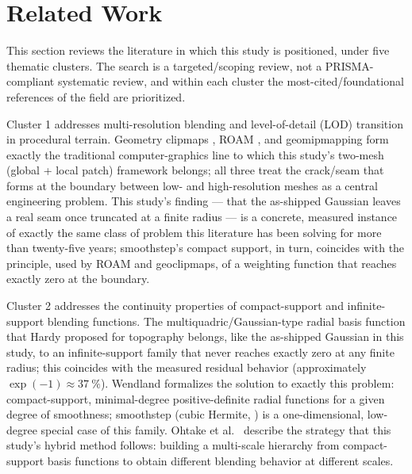 \section{Related Work}
\label{sec:ilgili}

This section reviews the literature in which this study is positioned,
under five thematic clusters. The search is a targeted/scoping review,
not a PRISMA-compliant systematic review, and within each cluster the
most-cited/foundational references of the field are prioritized.

Cluster 1 addresses multi-resolution blending and level-of-detail (LOD)
transition in procedural terrain. Geometry clipmaps
\citep{losasso2004geometry}, ROAM \citep{duchaineau1997roaming}, and
geomipmapping \citep{deboer2000geomipmapping} form exactly the
traditional computer-graphics line to which this study's two-mesh
(global + local patch) framework belongs; all three treat the
crack/seam that forms at the boundary between low- and high-resolution
meshes as a central engineering problem. This study's finding --- that
the as-shipped Gaussian leaves a real seam once truncated at a finite
radius --- is a concrete, measured instance of exactly the same class of
problem this literature has been solving for more than twenty-five
years; smoothstep's compact support, in turn, coincides with the
principle, used by ROAM and geoclipmaps, of a weighting function that
reaches exactly zero at the boundary.

Cluster 2 addresses the continuity properties of compact-support and
infinite-support blending functions. The multiquadric/Gaussian-type
radial basis function that Hardy \citep{hardy1971multiquadric} proposed
for topography belongs, like the as-shipped Gaussian in this study, to
an infinite-support family that never reaches exactly zero at any finite
radius; this coincides with the measured residual behavior (approximately
$\exp(-1)\approx\SI{37}{\percent}$). Wendland
\citep{wendland1995piecewise} formalizes the solution to exactly this
problem: compact-support, minimal-degree positive-definite radial
functions for a given degree of smoothness; smoothstep (cubic Hermite,
\citep{ebert2002texturing}) is a one-dimensional, low-degree special case
of this family. Ohtake et al.\ \citep{ohtake2003multiscale} describe the
strategy that this study's hybrid method follows: building a
multi-scale hierarchy from compact-support basis functions to obtain
different blending behavior at different scales.

